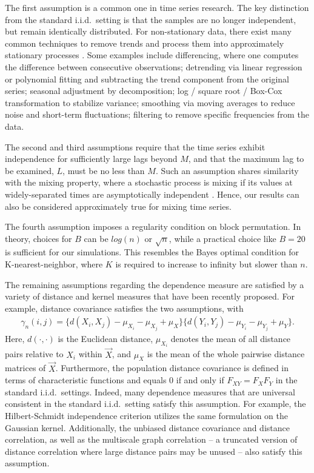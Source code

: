 The first assumption is a common one in time series research. The key distinction from the standard i.i.d.~setting is that the samples are no longer independent, but remain identically distributed. For non-stationary data, there exist many common techniques to remove trends and process them into approximately stationary processes \cite{cleveland1990stl,hastie2009elements,enders2010applied,shumway2010time,box2015time}. Some examples include differencing, where one computes the difference between consecutive observations; detrending via linear regression or polynomial fitting and subtracting the trend component from the original series; seasonal adjustment by decomposition; log / square root / Box-Cox transformation to stabilize variance; smoothing via moving averages to reduce noise and short-term fluctuations; filtering to remove specific frequencies from the data. 

The second and third assumptions require that the time series exhibit independence for sufficiently large lags beyond $M$, and that the maximum lag to be examined, $L$, must be no less than $M$. Such an assumption shares similarity with the mixing property, where a stochastic process is mixing if its values at widely-separated times are asymptotically independent \cite{Tran1985,McDonald11a,Ziemann2022}. Hence, our results can also be considered approximately true for mixing time series.

The fourth assumption imposes a regularity condition on block permutation. In theory, choices for $B$ can be $log(n)$ or $\sqrt{n}$, while a practical choice like $B=20$ is sufficient for our simulations. This resembles the Bayes optimal condition for K-nearest-neighbor, where $K$ is required to increase to infinity but slower than $n$.

The remaining assumptions regarding the dependence measure are satisfied by a variety of distance and kernel measures that have been recently proposed. For example, distance covariance satisfies the two assumptions, with
\begin{align*}
    \gamma_{n}(i,j) = \{d(X_i, X_j) - \mu_{X_i} - \mu_{X_j} + \mu_{X}\}\{d(Y_i, Y_j) - \mu_{Y_i} - \mu_{Y_j} + \mu_{Y}\}.
\end{align*} 
Here, $d(\cdot, \cdot)$ is the Euclidean distance, $\mu_{X_i}$ denotes the mean of all distance pairs relative to $X_i$ within $\vec{X}$, and $\mu_{X}$ is the mean of the whole pairwise distance matrices of $\vec{X}$. Furthermore, the population distance covariance is defined in terms of characteristic functions and equals $0$ if and only if $F_{XY}=F_{X} F_{Y}$ in the standard i.i.d.~settings. Indeed, many dependence measures that are universal consistent in the standard i.i.d.~setting satisfy this assumption. For example, the Hilbert-Schmidt independence criterion utilizes the same formulation \cite{exact2,dino2013} on the Gaussian kernel. Additionally, the unbiased distance covariance and distance correlation, as well as the multiscale graph correlation -- a truncated version of distance correlation where large distance pairs may be unused -- also satisfy this assumption.

